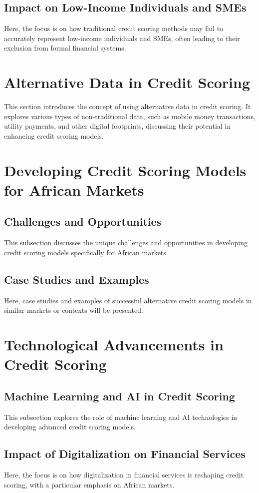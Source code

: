 \documentclass[a4paper,11pt,fleqn]{report}
\begin{document}
\subsection{Impact on Low-Income Individuals and SMEs}
Here, the focus is on how traditional credit scoring methods may fail to accurately represent low-income individuals and SMEs, often leading to their exclusion from formal financial systems.

\section{Alternative Data in Credit Scoring}
This section introduces the concept of using alternative data in credit scoring. It explores various types of non-traditional data, such as mobile money transactions, utility payments, and other digital footprints, discussing their potential in enhancing credit scoring models.

\section{Developing Credit Scoring Models for African Markets}
\subsection{Challenges and Opportunities}
This subsection discusses the unique challenges and opportunities in developing credit scoring models specifically for African markets.
\subsection{Case Studies and Examples}
Here, case studies and examples of successful alternative credit scoring models in similar markets or contexts will be presented.

\section{Technological Advancements in Credit Scoring}
\subsection{Machine Learning and AI in Credit Scoring}
This subsection explores the role of machine learning and AI technologies in developing advanced credit scoring models.
\subsection{Impact of Digitalization on Financial Services}
Here, the focus is on how digitalization in financial services is reshaping credit scoring, with a particular emphasis on African markets.
\end{document}
